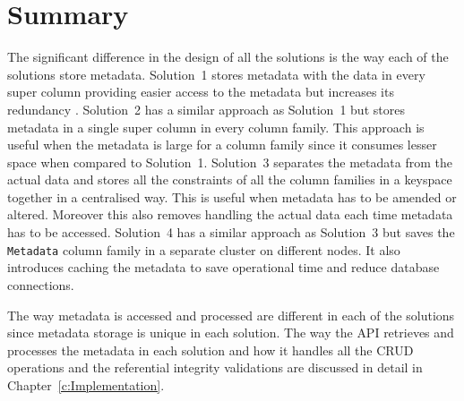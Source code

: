 \section{Summary}\label{s:Design-summary}
The significant difference in the design of all the  solutions is the way each
of the solutions store metadata.  Solution~1 stores metadata with the data in
every super column providing easier access to the metadata but increases its
redundancy . 
Solution~2 has a similar approach as Solution~1 but stores metadata in a single
super column in every column family. This approach is useful when the metadata
is large for a column family since it consumes lesser space when compared to Solution~1.
Solution~3 separates the metadata from
the actual data and stores all the constraints of all the column families in a
keyspace together in a centralised way.  This is useful when metadata has to be
amended or altered. 
Moreover this also removes handling the actual data each time metadata has to be
accessed.  
Solution~4 has a similar approach as Solution~3 but saves the \texttt{Metadata}
column family in a separate cluster on different nodes.  It also introduces
caching the metadata  to save operational time and reduce database connections. 

The way metadata is accessed and processed are different in each of the
solutions since metadata storage is unique in each  solution.  The way the
\ac{API} retrieves and processes the metadata in each solution and how it
handles all the \ac{CRUD} operations and the referential integrity validations 
are discussed in detail in Chapter~\ref{c:Implementation}. 



